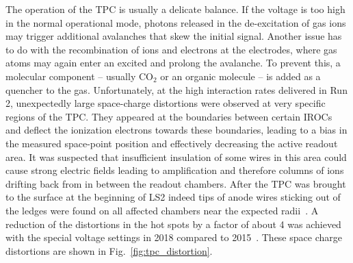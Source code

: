 The operation of the TPC is usually a delicate balance. If the voltage is too high in the normal operational mode, photons released in the de-excitation of gas ions may trigger additional avalanches that skew the initial signal. Another issue has to do with the recombination of ions and electrons at the electrodes, where gas atoms may again enter an excited and prolong the avalanche. To prevent this, a molecular component – usually CO$_2$ or an organic molecule – is added as a quencher to the gas. Unfortunately, at the high interaction rates delivered in Run 2, unexpectedly large space-charge distortions were observed at very specific regions of the TPC. They appeared at the boundaries between certain IROCs and deflect the ionization electrons towards these boundaries, leading to a bias in the measured space-point position and effectively decreasing the active readout area. It was suspected that insufficient insulation of some wires in this area could cause strong electric fields leading to amplification and therefore columns of ions drifting back from in between the readout chambers. After the TPC was brought to the surface at the beginning of LS2 indeed tips of anode wires sticking out of the ledges were found on all affected chambers near the expected radii~\cite{Schmidt2020}. A reduction of the distortions in the hot spots by a factor of about 4 was achieved with the special voltage settings in 2018 compared to 2015~. These space charge distortions are shown in Fig.~\ref{fig:tpc_distortion}.

